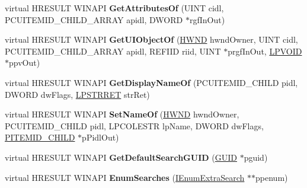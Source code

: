 \begin{DoxyCompactItemize}
\item 
\mbox{\label{class_c_f_s_folder_a07288e4c4aabd7a5da1da574acaebc08}} 
virtual H\+R\+E\+S\+U\+LT W\+I\+N\+A\+PI {\bfseries Get\+Attributes\+Of} (U\+I\+NT cidl, P\+C\+U\+I\+T\+E\+M\+I\+D\+\_\+\+C\+H\+I\+L\+D\+\_\+\+A\+R\+R\+AY apidl, D\+W\+O\+RD $\ast$rgf\+In\+Out)
\item 
\mbox{\label{class_c_f_s_folder_af0036966082fc0582c5ffd985fa6b84e}} 
virtual H\+R\+E\+S\+U\+LT W\+I\+N\+A\+PI {\bfseries Get\+U\+I\+Object\+Of} (\hyperlink{interfacevoid}{H\+W\+ND} hwnd\+Owner, U\+I\+NT cidl, P\+C\+U\+I\+T\+E\+M\+I\+D\+\_\+\+C\+H\+I\+L\+D\+\_\+\+A\+R\+R\+AY apidl, R\+E\+F\+I\+ID riid, U\+I\+NT $\ast$prgf\+In\+Out, \hyperlink{interfacevoid}{L\+P\+V\+O\+ID} $\ast$ppv\+Out)
\item 
\mbox{\label{class_c_f_s_folder_ac0ccb2ad8fa2a5689ac0b5f691fbf593}} 
virtual H\+R\+E\+S\+U\+LT W\+I\+N\+A\+PI {\bfseries Get\+Display\+Name\+Of} (P\+C\+U\+I\+T\+E\+M\+I\+D\+\_\+\+C\+H\+I\+LD pidl, D\+W\+O\+RD dw\+Flags, \hyperlink{struct___s_t_r_r_e_t}{L\+P\+S\+T\+R\+R\+ET} str\+Ret)
\item 
\mbox{\label{class_c_f_s_folder_afae02452e87f1b4f61832da3083bb2ab}} 
virtual H\+R\+E\+S\+U\+LT W\+I\+N\+A\+PI {\bfseries Set\+Name\+Of} (\hyperlink{interfacevoid}{H\+W\+ND} hwnd\+Owner, P\+C\+U\+I\+T\+E\+M\+I\+D\+\_\+\+C\+H\+I\+LD pidl, L\+P\+C\+O\+L\+E\+S\+TR lp\+Name, D\+W\+O\+RD dw\+Flags, \hyperlink{struct___i_t_e_m_i_d___c_h_i_l_d}{P\+I\+T\+E\+M\+I\+D\+\_\+\+C\+H\+I\+LD} $\ast$p\+Pidl\+Out)
\item 
\mbox{\label{class_c_f_s_folder_a0be809ff8c32f3c60f76935a219b39bf}} 
virtual H\+R\+E\+S\+U\+LT W\+I\+N\+A\+PI {\bfseries Get\+Default\+Search\+G\+U\+ID} (\hyperlink{interface_g_u_i_d}{G\+U\+ID} $\ast$pguid)
\item 
\mbox{\label{class_c_f_s_folder_ace93d39075eec3c9fdee1cbc9c94ca12}} 
virtual H\+R\+E\+S\+U\+LT W\+I\+N\+A\+PI {\bfseries Enum\+Searches} (\hyperlink{interface_i_enum_extra_search}{I\+Enum\+Extra\+Search} $\ast$$\ast$ppenum)
\item 
\mbox{\label{class_c_f_s_folder_a37cf03204f239a203842952ac8e750dd}} 
$$
\end{DoxyCompactItemize}
